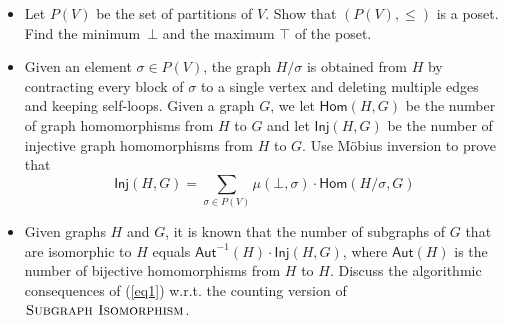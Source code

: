 \documentclass{uebung_cs}
\begin{document}
\begin{exercise}
\begin{enumerate}
          \begin{itemize}
            \item Let $P(V)$ be the set of partitions of $V$. Show that $(P(V),\leq)$ is a poset. Find the minimum~$\bot$ and the maximum $\top$ of the poset.
            \item Given an element $\sigma \in P(V)$, the graph $H/\sigma$ is obtained from $H$ by contracting every block of $\sigma$ to a single vertex and deleting multiple edges and keeping self-loops. Given a graph $G$, we let $\mathsf{Hom}(H,G)$ be the number of graph homomorphisms from $H$ to $G$ and let $\mathsf{Inj}(H,G)$ be the number of injective graph homomorphisms from $H$ to $G$. Use Möbius inversion to prove that
                  \begin{equation}\label{eq1}
                    \mathsf{Inj}(H,G) = \sum_{\sigma \in P(V)} \mu(\bot,\sigma)\cdot \mathsf{Hom}(H/\sigma,G)
                  \end{equation}
            \item Given graphs $H$ and $G$, it is known that the number of subgraphs of $G$ that are isomorphic to $H$ equals $\mathsf{Aut}^{-1}(H)\cdot \mathsf{Inj}(H,G)$, where $\mathsf{Aut}(H)$ is the number of bijective homomorphisms from $H$ to $H$. Discuss the algorithmic consequences of (\ref{eq1}) w.r.t. the counting version of $\textsc{Subgraph Isomorphism}$.
          \end{itemize}
  \end{enumerate}
\end{exercise}
\end{document}

